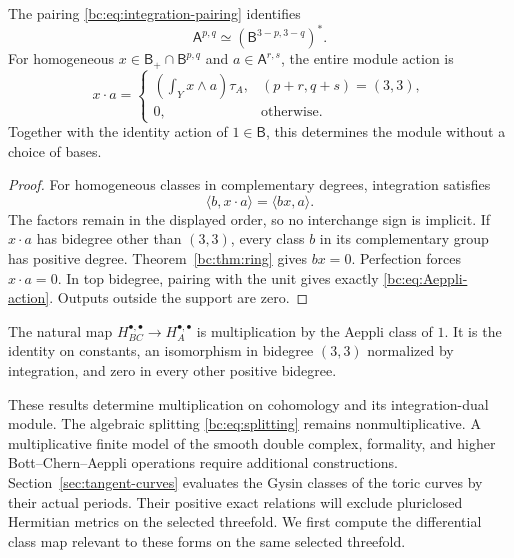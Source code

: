 \begin{proposition}\label{bc:prop:Aeppli-module}
The pairing \eqref{bc:eq:integration-pairing} identifies
\[
                \mathsf A^{p,q}\simeq(\mathsf B^{3-p,3-q})^*.
\]
For homogeneous $x\in\mathsf B_+\cap\mathsf B^{p,q}$ and
$a\in\mathsf A^{r,s}$, the entire module action is
\begin{equation}\label{bc:eq:Aeppli-action}
 x\cdot a=
 \begin{cases}
  \displaystyle\left(\int_Yx\wedge a\right)\tau_A,
                  &(p+r,q+s)=(3,3),\\[4pt]
  0,              &\text{otherwise}.
 \end{cases}
\end{equation}
Together with the identity action of $1\in\mathsf B$, this
determines the module without a choice of bases.
\end{proposition}

\begin{proof}
For homogeneous classes in complementary degrees, integration satisfies
\[
                 \langle b,x\cdot a\rangle=\langle bx,a\rangle.
\]
The factors remain in the displayed order, so no interchange sign
is implicit. If $x\cdot a$ has bidegree other than $(3,3)$,
every class $b$ in its complementary group has positive degree.
Theorem~\ref{bc:thm:ring} gives $bx=0$.
Perfection forces $x\cdot a=0$.
In top bidegree, pairing with the unit gives exactly
\eqref{bc:eq:Aeppli-action}. Outputs outside the support are zero.
\end{proof}

The natural map $H_{BC}^{\bullet,\bullet}\to H_A^{\bullet,\bullet}$
is multiplication by the Aeppli class of $1$.
It is the identity on constants, an isomorphism in bidegree
$(3,3)$ normalized by integration, and zero in every other
positive bidegree.

These results determine multiplication on cohomology and its
integration-dual module. The algebraic splitting
\eqref{bc:eq:splitting} remains nonmultiplicative.
A multiplicative finite model of the smooth double complex,
formality, and higher Bott--Chern--Aeppli operations require
additional constructions. Section~\ref{sec:tangent-curves}
evaluates the Gysin classes of the toric curves by their actual
periods. Their positive exact relations will exclude
pluriclosed Hermitian metrics on the selected threefold.
We first compute the differential class map relevant to these
forms on the same selected threefold.
